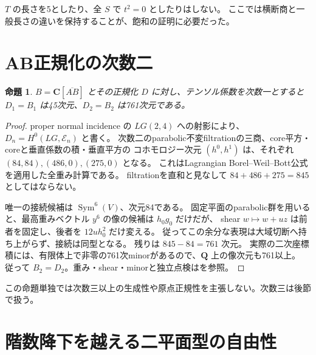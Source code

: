 \documentclass[11pt,a4paper]{ltjsarticle}
\newcommand{\CC}{\mathbf C}
\newcommand{\QQ}{\mathbf Q}
\newtheorem{proposition}[theorem]{命題}
\theoremstyle{remark}
\begin{document}
$T$ の長さを5としたり、全 $S$ で $t^2=0$ としたりはしない。
ここでは横断商と一般長さの違いを保持することが、飽和の証明に必要だった。

\section{AB正規化の次数二}
\begin{proposition}
$B=\CC[\overline{AB}]$ とその正規化 $D$ に対し、テンソル係数を次数一とすると
$D_1=B_1$ は45次元、$D_2=B_2$ は761次元である。
\end{proposition}
\begin{proof}
proper normal incidence の $LG(2,4)$ への射影により、
$D_n=H^0(LG,\mathcal E_n)$ と書く。
次数二のparabolic不変filtrationの三商、core平方・coreと垂直係数の積・垂直平方の
コホモロジー次元 $(h^0,h^1)$ は、それぞれ $(84,84),(486,0),(275,0)$ となる。
これはLagrangian Borel--Weil--Bott公式を適用した全重み計算である。
filtrationを直和と見なして $84+486+275=845$ としてはならない。

唯一の接続候補は $\operatorname{Sym}^6(V)$、次元84である。
固定平面のparabolic群を用いると、最高重みベクトル $y^6$ の像の候補は $h_0g_0$ だけだが、
shear $w\mapsto w+uz$ は前者を固定し、後者を $12u h_0^2$ だけ変える。
従ってこの余分な表現は大域切断へ持ち上がらず、接続は同型となる。
残りは $845-84=761$ 次元。
実際の二次座標積には、有限体上で非零の761次minorがあるので、$\QQ$ 上の像次元も761以上。
従って $B_2=D_2$。重み・shear・minorと独立点検は\cite{ab-degree2-v36}を参照。
\end{proof}
この命題単独では次数三以上の生成性や原点正規性を主張しない。次数三は後節で扱う。

\section{階数降下を越える二平面型の自由性}
\end{document}
